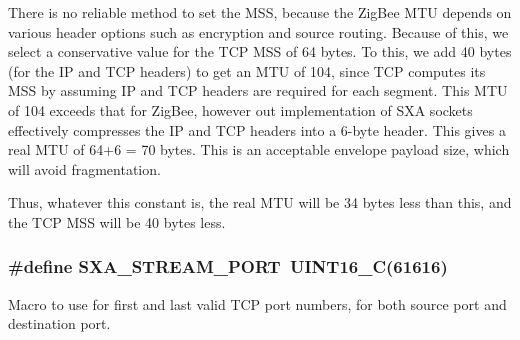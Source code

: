 There is no reliable method to set the M\-S\-S, because the Zig\-Bee M\-T\-U depends on various header options such as encryption and source routing. Because of this, we select a conservative value for the T\-C\-P M\-S\-S of 64 bytes. To this, we add 40 bytes (for the I\-P and T\-C\-P headers) to get an M\-T\-U of 104, since T\-C\-P computes its M\-S\-S by assuming I\-P and T\-C\-P headers are required for each segment. This M\-T\-U of 104 exceeds that for Zig\-Bee, however out implementation of S\-X\-A sockets effectively compresses the I\-P and T\-C\-P headers into a 6-\/byte header. This gives a real M\-T\-U of 64+6 = 70 bytes. This is an acceptable envelope payload size, which will avoid fragmentation.

Thus, whatever this constant is, the real M\-T\-U will be 34 bytes less than this, and the T\-C\-P M\-S\-S will be 40 bytes less. \hypertarget{group___s_x_a_ga686d56084362bb9152a4d5e6b048b80d}{
\subsubsection[{S\-X\-A\-\_\-\-S\-T\-R\-E\-A\-M\-\_\-\-P\-O\-R\-T}]{\setlength{\rightskip}{0pt plus 5cm}\#define S\-X\-A\-\_\-\-S\-T\-R\-E\-A\-M\-\_\-\-P\-O\-R\-T~U\-I\-N\-T16\-\_\-\-C(61616)}}\label{group___s_x_a_ga686d56084362bb9152a4d5e6b048b80d}


Macro to use for first and last valid T\-C\-P port numbers, for both source port and destination port. 

